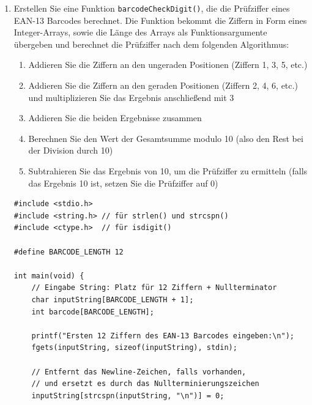 \begin{enumerate}
\begin{verbatim}
    return 0;
}
\end{verbatim}

\begin{mybox}[Bildschirmausgabe]{console}
Ersten 12 Ziffern des EAN-13 Barcodes eingeben:
4 5 9 8 7 6 3 4 2 1 7 8
\end{mybox}



\pagebreak

\item Erstellen Sie eine Funktion \texttt{barcodeCheckDigit()}, die die
Prüfziffer eines EAN-13 Barcodes berechnet. Die Funktion bekommt die Ziffern in
Form eines Integer-Arrays, sowie die Länge des Arrays als Funktionsargumente
übergeben und berechnet die Prüfziffer nach dem folgenden Algorithmus:

\begin{enumerate}[1.]
    \item Addieren Sie die Ziffern an den ungeraden Positionen (Ziffern 1, 3, 5,
    etc.)
    \item Addieren Sie die Ziffern an den geraden Positionen (Ziffern 2, 4, 6,
    etc.) und multiplizieren Sie das Ergebnis anschließend mit 3
    \item Addieren Sie die beiden Ergebnisse zusammen
    \item Berechnen Sie den Wert der Gesamtsumme modulo 10 (also den Rest bei
    der Division durch 10)
    \item Subtrahieren Sie das Ergebnis von 10, um die Prüfziffer zu ermitteln
    (falls das Ergebnis 10 ist, setzen Sie die Prüfziffer auf 0)
\end{enumerate}

\Vorlage
\begin{verbatim}
#include <stdio.h>
#include <string.h> // für strlen() und strcspn()
#include <ctype.h>  // für isdigit()

#define BARCODE_LENGTH 12

int main(void) {
    // Eingabe String: Platz für 12 Ziffern + Nullterminator
    char inputString[BARCODE_LENGTH + 1];
    int barcode[BARCODE_LENGTH];

    printf("Ersten 12 Ziffern des EAN-13 Barcodes eingeben:\n");
    fgets(inputString, sizeof(inputString), stdin);

    // Entfernt das Newline-Zeichen, falls vorhanden,
    // und ersetzt es durch das Nullterminierungszeichen
    inputString[strcspn(inputString, "\n")] = 0;



\end{verbatim}
\end{enumerate}

